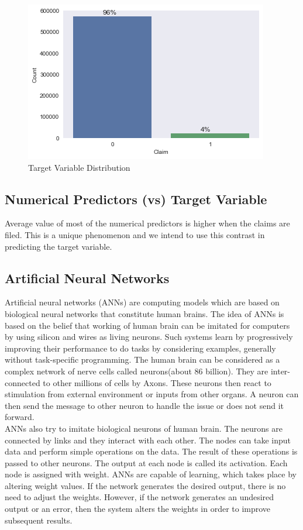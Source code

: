 \begin{figure}[!ht]
 \centering\includegraphics[width=\columnwidth]{images/target.png}
 \caption{Target Variable Distribution}\label{f:numerical}
\end{figure}

\subsection{Numerical Predictors (vs) Target Variable}
 Average value of most of the numerical predictors is higher when the claims are filed. This is a unique phenomenon and we intend to use this contrast in predicting the target variable.
  
\subsection{Artificial Neural Networks}
Artificial neural networks (ANNs)  are computing models which are based on biological neural networks that constitute human brains. The idea of ANNs is based on the belief that working of human brain can be imitated for computers by using silicon and wires as living neurons. Such systems learn by progressively improving their performance to do tasks by considering examples, generally without task-specific programming. The human brain can be considered as a complex network of nerve cells called neurons(about 86 billion). They are inter-connected to other millions of cells by Axons. These neurons then react to stimulation from external environment or inputs from other organs. A neuron can then send the message to other neuron to handle the issue or does not send it forward. 
\\
ANNs also try to imitate biological neurons of human brain. The neurons are connected by links and they interact with each other. The nodes can take input data and perform simple operations on the data. The result of these operations is passed to other neurons. The output at each node is called its activation. Each node is assigned with weight. ANNs are capable of learning, which takes place by altering weight values. If the network generates the desired output, there is no need to adjust the weights. However, if the network generates an undesired output or an error, then the system alters the weights in order to improve subsequent results.

